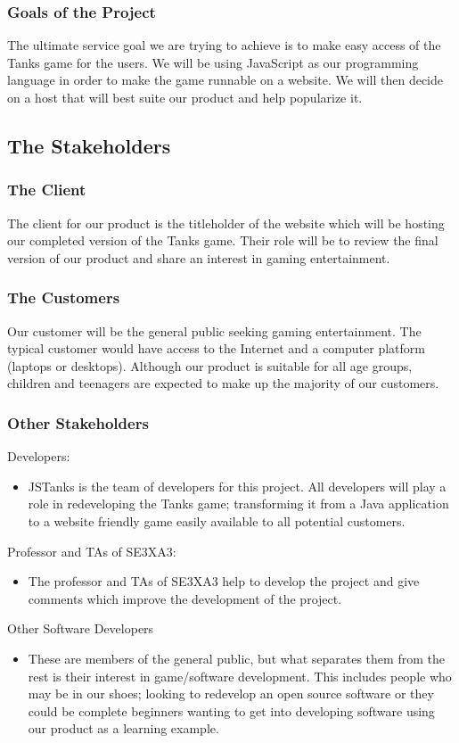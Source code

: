 \documentclass[12pt, titlepage]{article}
\begin{document}
\subsubsection{Goals of the Project}
The ultimate service goal we are trying to achieve is to make easy access of the 
Tanks game for the users. We will be using JavaScript as our programming language 
in order to make the game runnable on a website. We will then decide on a host that 
will best suite our product and help popularize it.
\subsection{The Stakeholders}
\subsubsection{The Client}
The client for our product is the titleholder of the website which will be hosting our 
completed version of the Tanks game. Their role will be to review the final version 
of our product and share an interest in gaming entertainment.
\subsubsection{The Customers}
Our customer will be the general public seeking gaming
entertainment. The typical customer would have access to the Internet and a
computer platform (laptops or desktops). Although our product is suitable for
all age groups, children and teenagers are expected to make up the majority of
our customers.
\subsubsection{Other Stakeholders}
Developers:
\begin{itemize} 
\item 
JSTanks is the team of developers for this project. All developers will play a role in
redeveloping the Tanks game; transforming it from a Java application to a
website friendly game easily available to all potential customers.
\end{itemize} 
Professor and TAs of SE3XA3:
\begin{itemize} 
\item 
The professor and TAs of SE3XA3 help to develop the project and give comments
which improve the development of the project.
\end{itemize} 
Other Software Developers 
\begin{itemize} 
\item 
These are members of the general public, but what separates them from the rest 
is their interest in game/software development. This includes people who may be 
in our shoes; looking to redevelop an open source software or they could be complete 
beginners wanting to get into developing software using our product as a learning 
example.
\end{itemize}
\end{document}
